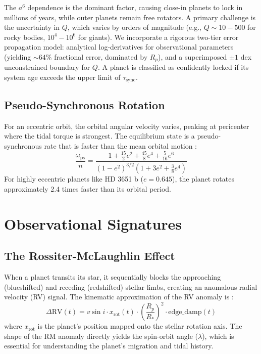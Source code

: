 \documentclass[a4paper,11pt]{article}
\numberwithin{equation}{section}
\begin{document}
The $a^6$ dependence is the dominant factor, causing close-in planets to lock in millions of years, while outer planets remain free rotators. A primary challenge is the uncertainty in $Q$, which varies by orders of magnitude (e.g., $Q \sim 10-500$ for rocky bodies, $10^4-10^6$ for giants). We incorporate a rigorous two-tier error propagation model: analytical log-derivatives for observational parameters (yielding $\sim 64\%$ fractional error, dominated by $R_p$), and a superimposed $\pm 1$ dex unconstrained boundary for $Q$. A planet is classified as confidently locked if its system age exceeds the upper limit of $\tau_{\text{sync}}$.

\subsection{Pseudo-Synchronous Rotation}
For an eccentric orbit, the orbital angular velocity varies, peaking at pericenter where the tidal torque is strongest. The equilibrium state is a pseudo-synchronous rate that is faster than the mean orbital motion \citep{Hut1981}:
\begin{equation}
    \frac{\omega_{\text{ps}}}{n} = \frac{1 + \frac{15}{2}e^2 + \frac{45}{8}e^4 + \frac{5}{16}e^6}{(1-e^2)^{3/2} \left(1 + 3e^2 + \frac{3}{8}e^4\right)}
\end{equation}
For highly eccentric planets like HD 3651 b ($e=0.645$), the planet rotates approximately 2.4 times faster than its orbital period.

\section{Observational Signatures}
\label{sec:obs}

\subsection{The Rossiter-McLaughlin Effect}
When a planet transits its star, it sequentially blocks the approaching (blueshifted) and receding (redshifted) stellar limbs, creating an anomalous radial velocity (RV) signal. The kinematic approximation of the RV anomaly is \citep{Ohta2005}:
\begin{equation}
    \Delta \text{RV}(t) = v \sin i \cdot x_{\text{rot}}(t) \cdot \left(\frac{R_p}{R_*}\right)^2 \cdot \text{edge\_damp}(t)
\end{equation}
where $x_{\text{rot}}$ is the planet's position mapped onto the stellar rotation axis. The shape of the RM anomaly directly yields the spin-orbit angle ($\lambda$), which is essential for understanding the planet's migration and tidal history. 
\end{document}
